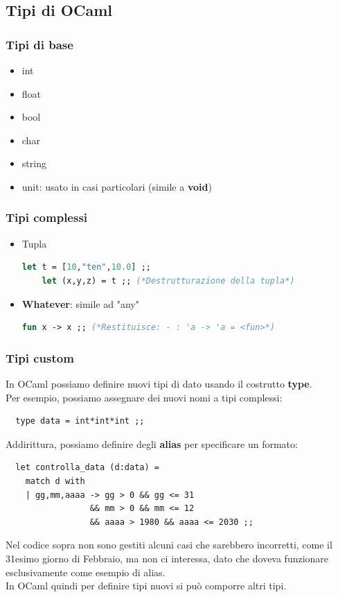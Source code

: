 \documentclass[12pt,a4paper]{article}
\begin{document}
\subsection{Tipi di OCaml}
\subsubsection{Tipi di base}
\begin{itemize}
  \item int 
  \item float
  \item bool
  \item char
  \item string
  \item unit: usato in casi particolari (simile a \textbf{void})
\end{itemize}
\subsubsection{Tipi complessi}
\begin{itemize}
  \item Tupla
  \begin{lstlisting}[language=OCaml]
    let t = [10,"ten",10.0] ;;
    let (x,y,z) = t ;; (*Destrutturazione della tupla*)
  \end{lstlisting}
  \item \textbf{Whatever}: simile ad "any"
  \begin{lstlisting}[language=Ocaml]
    fun x -> x ;; (*Restituisce: - : 'a -> 'a = <fun>*)
  \end{lstlisting}
\end{itemize}
\subsubsection{Tipi custom}
In OCaml possiamo definire nuovi tipi di dato usando il costrutto \textbf{type}.\\
Per esempio, possiamo assegnare dei nuovi nomi a tipi complessi:
\begin{lstlisting}
  type data = int*int*int ;;
\end{lstlisting}
Addirittura, possiamo definire degli \textbf{alias} per specificare un formato:
\begin{lstlisting}
  let controlla_data (d:data) =
    match d with
    | gg,mm,aaaa -> gg > 0 && gg <= 31
                 && mm > 0 && mm <= 12
                 && aaaa > 1980 && aaaa <= 2030 ;;
\end{lstlisting}
Nel codice sopra non sono gestiti alcuni casi che sarebbero incorretti, come il 31esimo giorno di Febbraio, ma non ci interessa, dato che doveva funzionare esclusivamente come esempio di alias.\\
In OCaml quindi per definire tipi nuovi si può comporre altri tipi.
\end{document}
